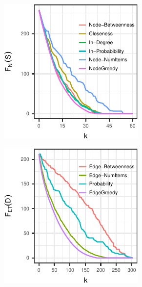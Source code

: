 



\begin{figure}
\begin{subfigure}[b]{0.23\textwidth}
\includegraphics[width=\textwidth]{figures/hubway_nodes.pdf}
\caption{{\nodeproblem}}
\label{fig:hubway_nodes}
\end{subfigure}
\begin{subfigure}[b]{0.23\textwidth}
\includegraphics[width=\textwidth]{figures/hubway_edges.pdf}

\end{subfigure}
\end{figure}
